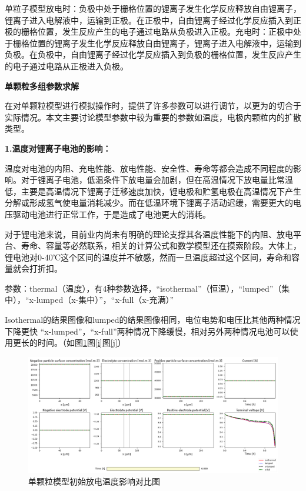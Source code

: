 \documentclass[12pt]{ctexart}%
\begin{document}
单粒子模型放电时：负极中处于栅格位置的锂离子发生化学反应释放自由锂离子，锂离子进入电解液中，运输到正极。在正极中，自由锂离子经过化学反应插入到正极的栅格位置，发生反应产生的电子通过电路从负极进入正极。充电时：正极中处于栅格位置的锂离子发生化学反应释放自由锂离子，锂离子进入电解液中，运输到负极。在负极中，自由锂离子经过化学反应插入到负极的栅格位置，发生反应产生的电子通过电路从正极进入负极。

\noindent\textbf{单颗粒多组参数求解}

在对单颗粒模型进行模拟操作时，提供了许多参数可以进行调节，以更为的切合于实际情况。本文主要讨论模型参数中较为重要的参数如温度，电极内颗粒内的扩散类型。

\noindent\textbf{1.温度对锂离子电池的影响：}

温度对电池的内阻、充电性能、放电性能、安全性、寿命等都会造成不同程度的影响。对于锂离子电池，低温条件下放电量会加剧，但在高温情况下放电量比常温低，主要是高温情况下锂离子迁移速度加快，锂电极和贮氢电极在高温情况下产生分解或形成氢气使电量消耗减少。而在低温环境下锂离子活动迟缓，需要更大的电压驱动电池进行正常工作，于是造成了电池更大的消耗。

对于锂电池来说，目前业内尚未有明确的理论支撑其各温度性能下的内阻、放电平台、寿命、容量等必然联系，相关的计算公式和数学模型还在摸索阶段。大体上，锂电池对0-40℃这个区间的温度并不敏感，然而一旦温度超过这个区间，寿命和容量就会打折扣。

参数：thermal（温度），有4种参数选择，“isothermal”（恒温），“lumped”（集中），“x-lumped（x-集中）”，“x-full（x-充满）”

Isothermal的结果图像和lumped的结果图像相同，电位电势和电压比其他两种情况下降更快 “x-lumped”，“x-full”两种情况下降缓慢，相对另外两种情况电池可以使用更长的时间。（如图\ref{h}图\ref{i}图\ref{j}）

\begin{figure}[h]
	\centering
	\includegraphics[scale = 0.4]{T0}
	\caption{单颗粒模型初始放电温度影响对比图}
	\label{h}
\end{figure}
\end{document}
